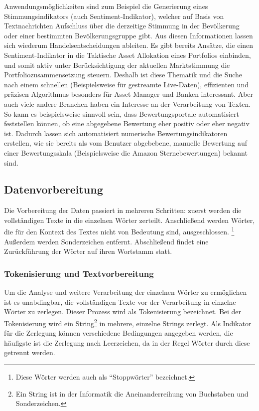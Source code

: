 \documentclass[a4paper,12pt]{article}
\begin{document}
Anwendungsmöglichkeiten sind zum Beispiel die Generierung eines Stimmungsindikators (auch Sentiment-Indikator), welcher auf Basis von Textnachrichten Aufschluss über die derzeitige Stimmung in der Bevölkerung oder einer bestimmten Bevölkerungsgruppe gibt. Aus diesen Informationen lassen sich wiederum Handelsentscheidungen ableiten. Es gibt bereits Ansätze, die einen Sentiment-Indikator in die Taktische Asset Allokation eines Portfolios einbinden, und somit aktiv unter Berücksichtigung der aktuellen Marktstimmung die Portfoliozusammensetzung steuern. Deshalb ist diese Thematik und die Suche nach einem schnellen (Beispielsweise für gestreamte Live-Daten), effizienten und präzisen Algorithmus besonders für Asset Manager und Banken interessant. Aber auch viele andere Branchen haben ein Interesse an der Verarbeitung von Texten. So kann es beispielsweise sinnvoll sein, dass Bewertungsportale automatisiert feststellen können, ob eine abgegebene Bewertung eher positiv oder eher negativ ist. Dadurch lassen sich automatisiert numerische Bewertungsindikatoren erstellen, wie sie bereits als vom Benutzer abgebebene, manuelle Bewertung auf einer Bewertungsskala (Beispielsweise die Amazon Sternebewertungen) bekannt sind. 

\newpage

\subsection{Datenvorbereitung}
Die Vorbereitung der Daten passiert in mehreren Schritten: zuerst werden die vollständigen Texte in die einzelnen Wörter zerteilt. Anschließend werden Wörter, die für den Kontext des Textes nicht von Bedeutung sind, ausgeschlossen. \footnote{Diese Wörter werden auch als ``Stoppwörter'' bezeichnet.} Außerdem werden Sonderzeichen entfernt. Abschließend findet eine Zurückführung der Wörter auf ihren Wortstamm statt. 

\subsubsection{Tokenisierung und Textvorbereitung}

Um die Analyse und weitere Verarbeitung der einzelnen Wörter zu ermöglichen ist es unabdingbar, die vollständigen Texte vor der Verarbeitung in einzelne Wörter zu zerlegen. Dieser Prozess wird als Tokenisierung bezeichnet. Bei der Tokenisierung wird ein String\footnote{Ein String ist in der Informatik die Aneinanderreihung von Buchstaben und Sonderzeichen.} in mehrere, einzelne Strings zerlegt. Als Indikator für die Zerlegung können verschiedene Bedingungen angegeben werden, die häufigste ist die Zerlegung nach Leerzeichen, da in der Regel Wörter durch diese getrennt werden. 
\end{document}
